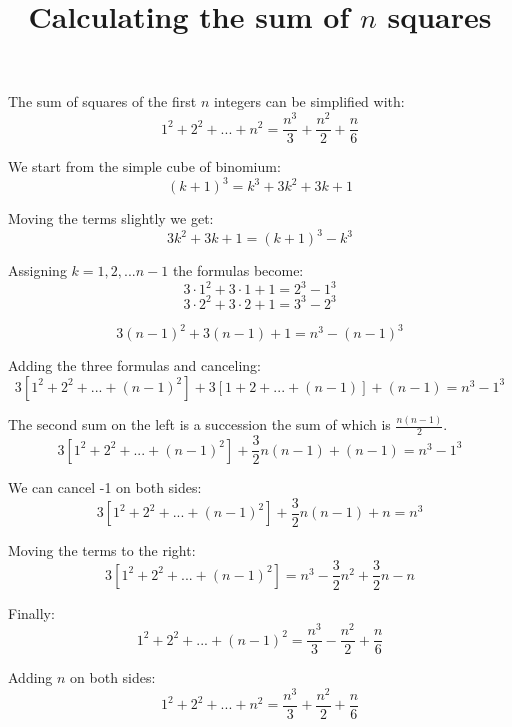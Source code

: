 \documentclass[a4paper,12pt]{article}
\title{Calculating the sum of $n$ squares}
\begin{document}
\maketitle

The sum of squares of the first $n$ integers can be simplified with:
$$
1^2 + 2^2 + ... + n^2 = \frac{n^3}{3} + \frac{n^2}{2} + \frac{n}{6}
$$

We start from the simple cube of binomium:
$$
(k + 1)^3 = k^3 + 3k^2 + 3k + 1
$$

Moving the terms slightly we get:
$$
3k^2 + 3k + 1 = (k + 1)^3 - k^3
$$

Assigning $k = 1, 2, ... n - 1$ the formulas become:
$$
3\cdot1^2 + 3\cdot1 + 1 = 2^3 - 1^3
$$
$$
3\cdot2^2 + 3\cdot2 + 1 = 3^3 - 2^3
$$

$$
3(n - 1)^2 + 3(n - 1) + 1 = n^3 - (n - 1)^3
$$

Adding the three formulas and canceling:
$$
3[1^2 + 2^2 + ... + (n - 1)^2] + 3[1 + 2 + ... + (n - 1)] + (n - 1) = n^3 - 1^3
$$

The second sum on the left is a succession the sum of which is $\frac{n(n-1)}{2}$.
$$
3[1^2 + 2^2 + ... + (n - 1)^2] + \frac{3}{2}n(n-1) + (n - 1) = n^3 - 1^3
$$

We can cancel -1 on both sides:
$$
3[1^2 + 2^2 + ... + (n - 1)^2] + \frac{3}{2}n(n-1) + n = n^3
$$

Moving the terms to the right:
$$
3[1^2 + 2^2 + ... + (n - 1)^2] = n^3 - \frac{3}{2}n^2 + \frac{3}{2}n - n
$$

Finally:
$$
1^2 + 2^2 + ... + (n - 1)^2 = \frac{n^3}{3} - \frac{n^2}{2} + \frac{n}{6}
$$

Adding $n$ on both sides:
$$
1^2 + 2^2 + ... + n^2 = \frac{n^3}{3} + \frac{n^2}{2} + \frac{n}{6}
$$
\end{document}
